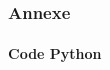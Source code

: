 \section[Annexe]{}


\begin{frame}[allowframebreaks]
    \frametitle{Annexe}
    \framesubtitle{Code Python}
    
\end{frame}
